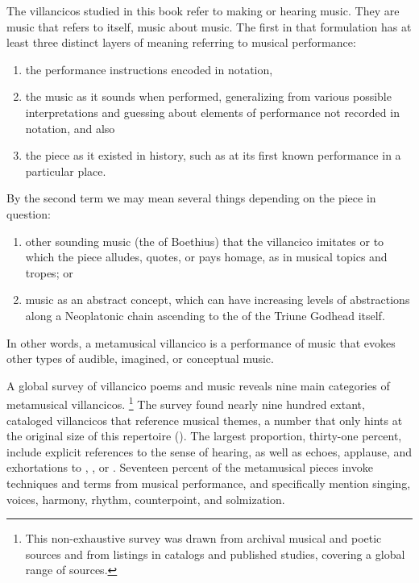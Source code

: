 The villancicos studied in this book refer to making or hearing music.
They are music that refers to itself, music about music.
The first  in that formulation has at least three distinct 
layers of meaning referring to musical performance: 
\begin{enumerate}
\item the performance instructions encoded in notation, 
\item the music as it sounds when performed, generalizing from various possible 
interpretations and guessing about elements of performance not recorded in 
notation, and also 
\item the piece as it existed in history, such as at its first known 
performance in a particular place.
\end{enumerate}
By the second term  we may mean several things depending on 
the piece in question: 
\begin{enumerate}
\item other sounding music (the  of Boethius) that 
the villancico imitates or to which the piece alludes, quotes, or pays homage, 
as in musical topics and tropes; or 
\item music as an abstract concept, which can have increasing levels of 
abstractions along a Neoplatonic chain ascending to the  of the 
Triune Godhead itself.
\end{enumerate}
In other words, a metamusical villancico is a performance of music that evokes 
other types of audible, imagined, or conceptual music.

A global survey of villancico poems and music reveals nine main categories of 
metamusical villancicos.%
  \footnote{This non-exhaustive survey was drawn from archival musical and 
poetic sources and from listings in catalogs and published studies, covering a 
global range of sources.}
The survey found nearly nine hundred extant, cataloged villancicos that 
reference musical themes, a number that only hints at the original size of this 
repertoire ().
The largest proportion, thirty-one percent, include explicit references to the 
sense of hearing, as well as echoes, applause, and exhortations to 
, , or .
Seventeen percent of the metamusical pieces invoke techniques and terms from 
musical performance, and specifically mention singing, voices, harmony, rhythm, 
counterpoint, and solmization.

